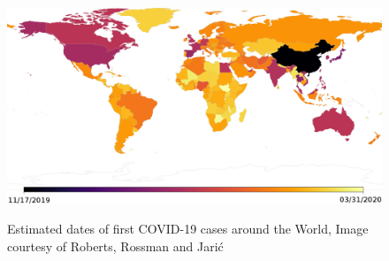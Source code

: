 \begin{figure}[H]
    \centering
    \includegraphics[width=1\textwidth,keepaspectratio]{Images/DateOfFirstCovidCaseMap.png}\\
    \caption{Estimated dates of first COVID-19 cases around the World, Image courtesy of Roberts, Rossman and Jarić\cite{covid19SpreadMap}}
    \label{fig:COVID-19 Case Map}
\end{figure}
\vspace{0.5mm}

